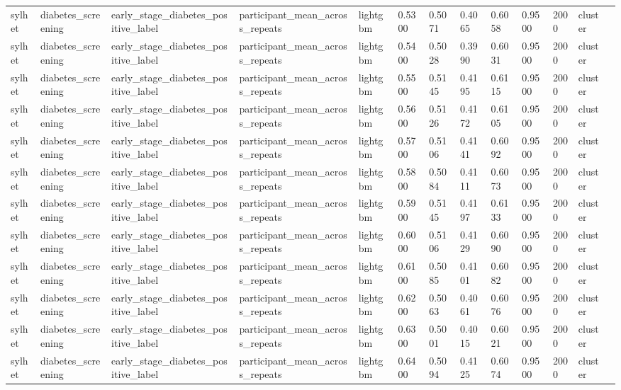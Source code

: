 \begin{tabular}{lllllllllllll}
sylhet & diabetes\_screening & early\_stage\_diabetes\_positive\_label & participant\_mean\_across\_repeats & lightgbm & 0.5300 & 0.5071 & 0.4065 & 0.6058 & 0.9500 & 2000 & cluster &  \\
sylhet & diabetes\_screening & early\_stage\_diabetes\_positive\_label & participant\_mean\_across\_repeats & lightgbm & 0.5400 & 0.5028 & 0.3990 & 0.6031 & 0.9500 & 2000 & cluster &  \\
sylhet & diabetes\_screening & early\_stage\_diabetes\_positive\_label & participant\_mean\_across\_repeats & lightgbm & 0.5500 & 0.5145 & 0.4195 & 0.6115 & 0.9500 & 2000 & cluster &  \\
sylhet & diabetes\_screening & early\_stage\_diabetes\_positive\_label & participant\_mean\_across\_repeats & lightgbm & 0.5600 & 0.5126 & 0.4172 & 0.6105 & 0.9500 & 2000 & cluster &  \\
sylhet & diabetes\_screening & early\_stage\_diabetes\_positive\_label & participant\_mean\_across\_repeats & lightgbm & 0.5700 & 0.5106 & 0.4141 & 0.6092 & 0.9500 & 2000 & cluster &  \\
sylhet & diabetes\_screening & early\_stage\_diabetes\_positive\_label & participant\_mean\_across\_repeats & lightgbm & 0.5800 & 0.5084 & 0.4111 & 0.6073 & 0.9500 & 2000 & cluster &  \\
sylhet & diabetes\_screening & early\_stage\_diabetes\_positive\_label & participant\_mean\_across\_repeats & lightgbm & 0.5900 & 0.5145 & 0.4197 & 0.6133 & 0.9500 & 2000 & cluster &  \\
sylhet & diabetes\_screening & early\_stage\_diabetes\_positive\_label & participant\_mean\_across\_repeats & lightgbm & 0.6000 & 0.5106 & 0.4129 & 0.6090 & 0.9500 & 2000 & cluster &  \\
sylhet & diabetes\_screening & early\_stage\_diabetes\_positive\_label & participant\_mean\_across\_repeats & lightgbm & 0.6100 & 0.5085 & 0.4101 & 0.6082 & 0.9500 & 2000 & cluster &  \\
sylhet & diabetes\_screening & early\_stage\_diabetes\_positive\_label & participant\_mean\_across\_repeats & lightgbm & 0.6200 & 0.5063 & 0.4061 & 0.6076 & 0.9500 & 2000 & cluster &  \\
sylhet & diabetes\_screening & early\_stage\_diabetes\_positive\_label & participant\_mean\_across\_repeats & lightgbm & 0.6300 & 0.5001 & 0.4015 & 0.6021 & 0.9500 & 2000 & cluster &  \\
sylhet & diabetes\_screening & early\_stage\_diabetes\_positive\_label & participant\_mean\_across\_repeats & lightgbm & 0.6400 & 0.5094 & 0.4125 & 0.6074 & 0.9500 & 2000 & cluster &  \\

\end{tabular}

